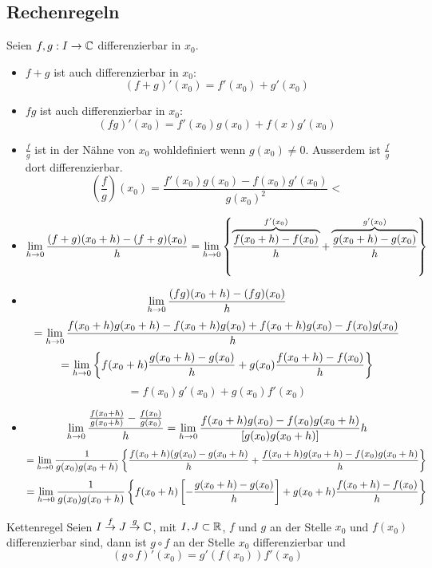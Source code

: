 \subsection{Rechenregeln}
\begin{Sat}
  Seien $f,g:I\to\mathbb{C}$ differenzierbar in $x_0$.
  \begin{itemize}
    \item $f+g$ ist auch differenzierbar in $x_0$: 
      \[(f+g)'(x_0)=f'(x_0)+g'(x_0)\]
    \item $fg$ ist auch differenzierbar in $x_0$: 
      \[(fg)'(x_0)=f'(x_0)g(x_0)+f(x)g'(x_0)\]
    \item $\frac{f}{g}$ ist in der Nähne von $x_0$ wohldefiniert wenn $g(x_0)\neq 0$. Ausserdem ist $\frac{f}{g}$ dort differenzierbar.
      \[\left( \frac{f}{g} \right)(x_0)=\frac{f'(x_0)g(x_0)-f(x_0)g'(x_0)}{g(x_0)^2}<\]
  \end{itemize}
\end{Sat}
\begin{Bew}
  \begin{itemize}
    \item
      \[\displaystyle\lim_{h\rightarrow0}\frac{(f+g)(x_0+h)-(f+g)(x_0)}{h}=\displaystyle\lim_{h\rightarrow0}\left\{ \overbrace{\frac{f(x_0+h)-f(x_0)}{h}}^{f'(x_0)}+\overbrace{\frac{g(x_0+h)-g(x_0)}{h}}^{g'(x_0)}\right\}\]
    \item
      \[\displaystyle\lim_{h\rightarrow0}\frac{(fg)(x_0+h)-(fg)(x_0)}{h}\]
      \[=\displaystyle\lim_{h\rightarrow0}\frac{f(x_0+h)g(x_0+h)-f(x_0+h)g(x_0)+f(x_0+h)g(x_0)-f(x_0)g(x_0)}{h}\]
      \[=\displaystyle\lim_{h\rightarrow0}\left\{ f(x_0+h)\frac{g(x_0+h)-g(x_0)}{h}+g(x_0)\frac{f(x_0+h)-f(x_0)}{h} \right\}\]
      \[=f(x_0)g'(x_0)+g(x_0)f'(x_0)\]
    \item
      \[\displaystyle\lim_{h\rightarrow0}\frac{\frac{f(x_0+h)}{g(x_0+h)}-\frac{f(x_0)}{g(x_0)}}{h}=\displaystyle\lim_{h\rightarrow0}\frac{f(x_0+h)g(x_0)-f(x_0)g(x_0+h)}{\left[ g(x_0)g(x_0+h) \right]}h\]
      \[=\displaystyle\lim_{h\rightarrow0}\frac{1}{g(x_0)g(x_0+h)}\left\{ \frac{f(x_0+h)(g(x_0)-g(x_0+h)}{h}+\frac{f(x_0+h)g(x_0+h)-f(x_0)g(x_0+h)}{h} \right\}\]
      \[=\displaystyle\lim_{h\rightarrow0}\frac{1}{g(x_0)g(x_0+h)}\left\{ f(x_0+h)\left[ -\frac{g(x_0+h)-g(x_0)}{h}\right] +g(x_0+h)\frac{f(x_0+h)-f(x_0)}{h} \right\}\]
  \end{itemize}
\end{Bew}
\begin{Sat}{Kettenregel}
  Seien $I\stackrel{f}{\to}J\stackrel{g}{\to}\mathbb{C}$, mit $I, J\subset\mathbb{R}$, $f$ und $g$ an der Stelle $x_0$ und $f(x_0)$ differenzierbar sind, dann ist $g\circ f$ an der Stelle $x_0$ differenzierbar und
  \[(g\circ f)'(x_0)=g'(f(x_0))f'(x_0)\]
\end{Sat}

